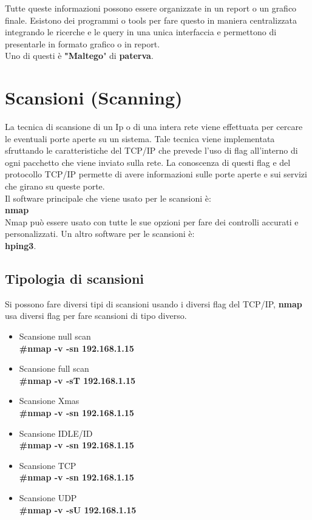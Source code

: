 \documentclass[a4paper,12pt]{article}
\begin{document}
Tutte queste informazioni possono essere organizzate in un report o un grafico finale. Esistono dei programmi o tools  per fare questo in maniera centralizzata integrando le ricerche e le query in una unica interfaccia e permettono di presentarle in formato grafico o in report.
\\ Uno di questi è \textbf{"Maltego}"\cite{maltego} di \textbf{paterva}\cite{paterva}. 

\section{ Scansioni (Scanning) }

La tecnica di scansione di un Ip o di una intera rete viene effettuata per cercare le eventuali porte aperte su un sistema. Tale tecnica viene implementata sfruttando le caratteristiche del TCP/IP che prevede l'uso di flag all'interno di ogni pacchetto che viene inviato sulla rete. La conoscenza di questi flag e del protocollo TCP/IP permette di avere informazioni sulle porte aperte e sui servizi che girano su queste porte. \\
Il software principale che viene usato per le scansioni è: \\
\textbf{nmap}\cite{nmap} \\
Nmap può essere usato con tutte le sue opzioni per fare dei controlli accurati e personalizzati.
Un altro software per le scansioni è: \\
\textbf{ hping3}\cite{hping3}.

\subsection{Tipologia di scansioni}
Si possono fare diversi tipi di scansioni usando i diversi flag del TCP/IP, \textbf{nmap}\cite{nmap} \\ usa diversi flag per fare scansioni di tipo diverso.
\begin{itemize}
    \item Scansione null scan \\
      \textbf{ \#nmap  -v -sn 192.168.1.15}
    \item Scansione full scan \\
        \textbf{ \#nmap  -v -sT 192.168.1.15}
    \item Scansione Xmas \\
        \textbf{ \#nmap  -v -sn 192.168.1.15}
    \item Scansione IDLE/ID \\
        \textbf{ \#nmap  -v -sn 192.168.1.15}
    \item Scansione TCP \\
        \textbf{ \#nmap  -v -sn 192.168.1.15}
    \item Scansione UDP \\
        \textbf{ \#nmap  -v -sU 192.168.1.15}
\end{itemize}
\end{document}
